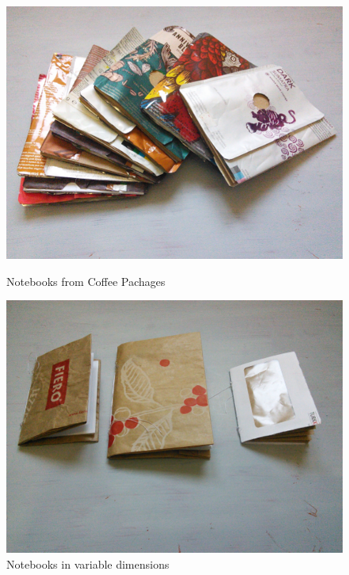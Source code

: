 \begin{figure}[!tbp]
  \centering
  \begin{minipage}[b]{0.48\textwidth}
    \includegraphics[width=\textwidth]{project_graphics/notebooks1.jpg}
    \caption{Notebooks from Coffee Pachages}
    \label{fig:Notebooks1}
  \end{minipage}
  \hfill
  \begin{minipage}[b]{0.48\textwidth}
    \includegraphics[width=\textwidth]{project_graphics/notebooks2.jpg}
    \caption{Notebooks in variable dimensions}
    \label{fig:Notebooks2}
  \end{minipage}
\end{figure}